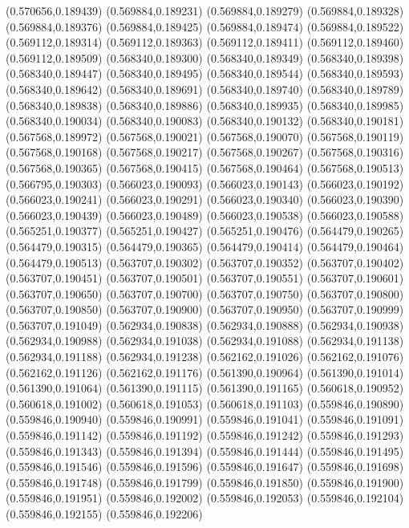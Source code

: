 (0.570656,0.189439)
(0.569884,0.189231)
(0.569884,0.189279)
(0.569884,0.189328)
(0.569884,0.189376)
(0.569884,0.189425)
(0.569884,0.189474)
(0.569884,0.189522)
(0.569112,0.189314)
(0.569112,0.189363)
(0.569112,0.189411)
(0.569112,0.189460)
(0.569112,0.189509)
(0.568340,0.189300)
(0.568340,0.189349)
(0.568340,0.189398)
(0.568340,0.189447)
(0.568340,0.189495)
(0.568340,0.189544)
(0.568340,0.189593)
(0.568340,0.189642)
(0.568340,0.189691)
(0.568340,0.189740)
(0.568340,0.189789)
(0.568340,0.189838)
(0.568340,0.189886)
(0.568340,0.189935)
(0.568340,0.189985)
(0.568340,0.190034)
(0.568340,0.190083)
(0.568340,0.190132)
(0.568340,0.190181)
(0.567568,0.189972)
(0.567568,0.190021)
(0.567568,0.190070)
(0.567568,0.190119)
(0.567568,0.190168)
(0.567568,0.190217)
(0.567568,0.190267)
(0.567568,0.190316)
(0.567568,0.190365)
(0.567568,0.190415)
(0.567568,0.190464)
(0.567568,0.190513)
(0.566795,0.190303)
(0.566023,0.190093)
(0.566023,0.190143)
(0.566023,0.190192)
(0.566023,0.190241)
(0.566023,0.190291)
(0.566023,0.190340)
(0.566023,0.190390)
(0.566023,0.190439)
(0.566023,0.190489)
(0.566023,0.190538)
(0.566023,0.190588)
(0.565251,0.190377)
(0.565251,0.190427)
(0.565251,0.190476)
(0.564479,0.190265)
(0.564479,0.190315)
(0.564479,0.190365)
(0.564479,0.190414)
(0.564479,0.190464)
(0.564479,0.190513)
(0.563707,0.190302)
(0.563707,0.190352)
(0.563707,0.190402)
(0.563707,0.190451)
(0.563707,0.190501)
(0.563707,0.190551)
(0.563707,0.190601)
(0.563707,0.190650)
(0.563707,0.190700)
(0.563707,0.190750)
(0.563707,0.190800)
(0.563707,0.190850)
(0.563707,0.190900)
(0.563707,0.190950)
(0.563707,0.190999)
(0.563707,0.191049)
(0.562934,0.190838)
(0.562934,0.190888)
(0.562934,0.190938)
(0.562934,0.190988)
(0.562934,0.191038)
(0.562934,0.191088)
(0.562934,0.191138)
(0.562934,0.191188)
(0.562934,0.191238)
(0.562162,0.191026)
(0.562162,0.191076)
(0.562162,0.191126)
(0.562162,0.191176)
(0.561390,0.190964)
(0.561390,0.191014)
(0.561390,0.191064)
(0.561390,0.191115)
(0.561390,0.191165)
(0.560618,0.190952)
(0.560618,0.191002)
(0.560618,0.191053)
(0.560618,0.191103)
(0.559846,0.190890)
(0.559846,0.190940)
(0.559846,0.190991)
(0.559846,0.191041)
(0.559846,0.191091)
(0.559846,0.191142)
(0.559846,0.191192)
(0.559846,0.191242)
(0.559846,0.191293)
(0.559846,0.191343)
(0.559846,0.191394)
(0.559846,0.191444)
(0.559846,0.191495)
(0.559846,0.191546)
(0.559846,0.191596)
(0.559846,0.191647)
(0.559846,0.191698)
(0.559846,0.191748)
(0.559846,0.191799)
(0.559846,0.191850)
(0.559846,0.191900)
(0.559846,0.191951)
(0.559846,0.192002)
(0.559846,0.192053)
(0.559846,0.192104)
(0.559846,0.192155)
(0.559846,0.192206)
